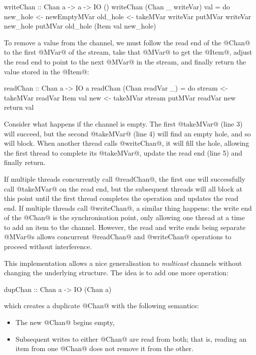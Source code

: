 \begin{haskell}
writeChan :: Chan a -> a -> IO ()
writeChan (Chan _ writeVar) val = do
  new_hole <- newEmptyMVar
  old_hole <- takeMVar writeVar
  putMVar writeVar new_hole
  putMVar old_hole (Item val new_hole)
\end{haskell}

To remove a value from the channel, we must follow the read end of the
@Chan@ to the first @MVar@ of the stream, take that @MVar@ to get the
@Item@, adjust the read end to point to the next @MVar@ in the stream,
and finally return the value stored in the @Item@:

\begin{numhaskell}
readChan :: Chan a -> IO a
readChan (Chan readVar _) = do
  stream <- takeMVar readVar
  Item val new <- takeMVar stream
  putMVar readVar new
  return val
\end{numhaskell}

\noindent Consider what happens if the channel is empty.  The first
@takeMVar@ (line 3) will succeed, but the second @takeMVar@ (line 4)
will find an empty hole, and so will block.  When another thread calls
@writeChan@, it will fill the hole, allowing the first thread to
complete its @takeMVar@, update the read end (line 5) and finally
return.

If multiple threads concurrently call @readChan@, the first one will
successfully call @takeMVar@ on the read end, but the subsequent
threads will all block at this point until the first thread completes
the operation and updates the read end.  If multiple threads call
@writeChan@, a similar thing happens: the write end of the @Chan@ is
the synchronisation point, only allowing one thread at a time to add
an item to the channel.  However, the read and write ends being
separate @MVar@s allows concurrent @readChan@ and @writeChan@
operations to proceed without interference.

This implementation allows a nice generalisation to \emph{multicast}
channels without changing the underlying structure.  The idea is to
add one more operation:

\begin{haskell}
dupChan :: Chan a -> IO (Chan a)
\end{haskell}

\noindent which creates a duplicate @Chan@ with the following
semantics:

\begin{itemize}
\item The new @Chan@ begins empty,
\item Subsequent writes to either @Chan@ are read from both; that is,
  reading an item from one @Chan@ does not remove it from the other.
\end{itemize}

